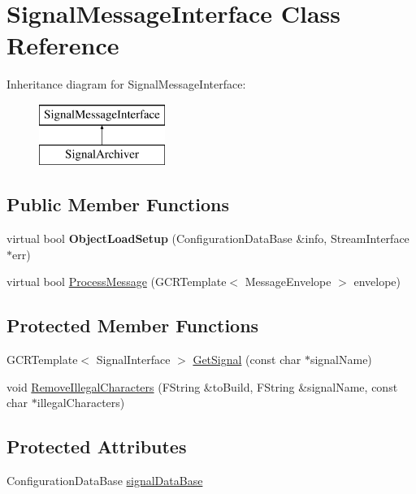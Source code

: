 \hypertarget{classSignalMessageInterface}{
\section{SignalMessageInterface Class Reference}
\label{classSignalMessageInterface}
}
Inheritance diagram for SignalMessageInterface:\begin{figure}[H]
\begin{center}
\leavevmode
\includegraphics[height=2.000000cm]{classSignalMessageInterface}
\end{center}
\end{figure}
\subsection*{Public Member Functions}
\begin{DoxyCompactItemize}
\item 
\hypertarget{classSignalMessageInterface_ad30c68bf40274ca07f78f2a282ecd9c3}{
virtual bool {\bfseries ObjectLoadSetup} (ConfigurationDataBase \&info, StreamInterface $\ast$err)}
\label{classSignalMessageInterface_ad30c68bf40274ca07f78f2a282ecd9c3}

\item 
virtual bool \hyperlink{classSignalMessageInterface_ae9f04a9f88929ffc4b9761a41d13cec7}{ProcessMessage} (GCRTemplate$<$ MessageEnvelope $>$ envelope)
\end{DoxyCompactItemize}
\subsection*{Protected Member Functions}
\begin{DoxyCompactItemize}
\item 
GCRTemplate$<$ SignalInterface $>$ \hyperlink{classSignalMessageInterface_a9ae57567143070dd72e8789d7ba02ab1}{GetSignal} (const char $\ast$signalName)
\item 
void \hyperlink{classSignalMessageInterface_a9236f714b5eb1164637662c4eb607e98}{RemoveIllegalCharacters} (FString \&toBuild, FString \&signalName, const char $\ast$illegalCharacters)
\end{DoxyCompactItemize}
\subsection*{Protected Attributes}
\begin{DoxyCompactItemize}
\item 
ConfigurationDataBase \hyperlink{classSignalMessageInterface_a4444ccf4557431cbd475af82a8131d58}{signalDataBase}
\end{DoxyCompactItemize}

